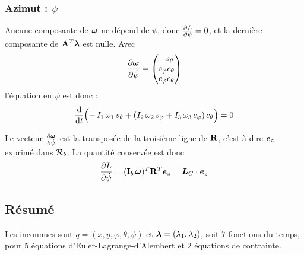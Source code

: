 \subsubsection{Azimut : \texorpdfstring{$\psi$}{psi}}

Aucune composante de $\bm{\omega}$ ne dépend de $\psi$, donc
$\frac{\partial L}{\partial \psi} = 0$, et la dernière composante de
$\mathbf{A}^T\bm{\lambda}$ est nulle. Avec
\[
    \frac{\partial \bm{\omega}}{\partial \dot\psi} = \begin{pmatrix}
        -s_\theta\\ s_\varphi c_\theta\\ c_\varphi c_\theta
    \end{pmatrix}
\]
l'équation en $\psi$ est donc : 
\[
    \frac{\mathrm{d}}{\mathrm{d} t}\Bigl(-\,I_1\,\omega_1\,s_\theta
    + (I_2\,\omega_2\,s_\varphi + I_3\,\omega_3\,c_\varphi)\,c_\theta
    \Bigr) = 0
\]

\begin{remarque}
    Le vecteur $\frac{\partial \bm{\omega}}{\partial \dot\psi}$ est la transposée de la troisième ligne de
    $\mathbf{R}$, c'est-à-dire $\bm{e}_z$ exprimé dans $\mathcal{R}_{b}$. La
    quantité conservée est donc
    \[
        \frac{\partial L}{\partial \dot\psi} = (\mathbf{I}_b\,\bm{\omega})^T\mathbf{R}^T
        \bm{e}_z = \bm{L}_G\cdot\bm{e}_z
    \]
\end{remarque}

\subsection{Résumé}

Les inconnues sont $q = (x,y,\varphi,\theta,\psi)$ et
$\bm{\lambda} = (\lambda_1,\lambda_2)$, soit $7$ fonctions du temps,
pour $5$ équations d'Euler-Lagrange-d'Alembert et $2$ équations de
contrainte.

